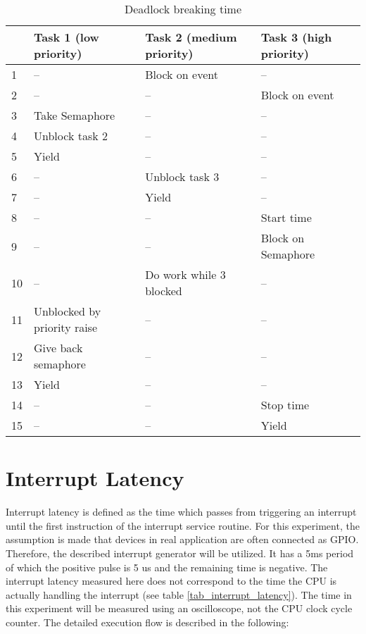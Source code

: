 \begin{table}[htbp]
	\centering
		\begin{tabular}{|l|l|l|l|}
			\hline
				& Task 1 (low priority)						& Task 2 (medium priority)	&  Task 3 (high priority)	\\
				\hline 
				1 & --															& Block on event						& --									\\
			  2 & --															& --												& Block on event			\\
			  3 & Take Semaphore 									& --												& --									\\
			  4 & Unblock task  2									& --							 					& --									\\
			  5 & Yield														& --												& --									\\
			  6 & --															&	Unblock task 3						& --									\\
			  7 & --															& Yield											& --									\\
			  8 & --															&	--												& Start time					\\  
			  9 & --															&	--												& Block on Semaphore	\\  	
			  10 & --															& Do work while 3 blocked		& --									\\	
			  11 & Unblocked by priority raise		&	--												& --									\\
			  12 & Give back semaphore						&	--												& --									\\	
			  13 & Yield													& --	  										& --									\\
			  14 & --															&	--												& Stop time						\\
			  15 & --															&	--												& Yield								\\
			\hline
		\end{tabular}
	\caption{Deadlock breaking time}
	\label{tab_deadlock}
\end{table}


\section{Interrupt Latency}
Interrupt latency is defined as the time which passes from triggering an interrupt until the first instruction of the interrupt service routine. 
For this  experiment, the assumption is made that devices in real application are often connected as \ac{GPIO}.
Therefore, the described interrupt generator will be utilized.
It has a 5ms period of which the positive pulse is 5 us and the remaining time is negative.
The interrupt latency measured here does not correspond to the time the \ac{CPU} is actually handling the interrupt (see table \ref{tab_interrupt_latency}).
The time in this experiment will be measured using an oscilloscope, not the \ac{CPU} clock cycle counter.
The detailed execution flow is described in the following:

